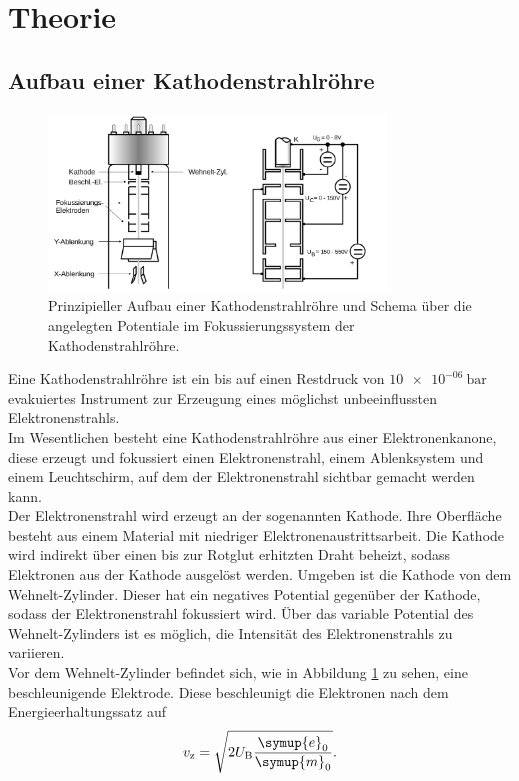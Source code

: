 \section{Theorie}
\label{sec:Theorie}
\subsection{Aufbau einer Kathodenstrahlröhre}
\begin{figure}
  \centering
  \includegraphics[width=0.8\textwidth]{Messdaten/kathode.png}
  \caption{Prinzipieller Aufbau einer Kathodenstrahlröhre und Schema über die angelegten Potentiale im Fokussierungssystem der Kathodenstrahlröhre.}
  \label{fig:kathode}
\end{figure}
Eine Kathodenstrahlröhre ist ein bis auf einen Restdruck von $\SI{10e-06}{\bar}$ evakuiertes Instrument zur Erzeugung eines möglichst unbeeinflussten Elektronenstrahls.\\
Im Wesentlichen besteht eine Kathodenstrahlröhre aus einer Elektronenkanone, diese erzeugt und fokussiert einen Elektronenstrahl, einem Ablenksystem und einem Leuchtschirm, auf dem der Elektronenstrahl sichtbar gemacht werden kann.\\
Der Elektronenstrahl wird erzeugt an der sogenannten Kathode. Ihre Oberfläche besteht aus einem Material mit niedriger Elektronenaustrittsarbeit.
Die Kathode wird indirekt über einen bis zur Rotglut erhitzten Draht beheizt, sodass
Elektronen aus der Kathode ausgelöst werden.
Umgeben ist die Kathode von dem Wehnelt-Zylinder. Dieser hat ein negatives Potential gegenüber der Kathode, sodass der Elektronenstrahl fokussiert wird. Über das variable Potential des Wehnelt-Zylinders ist es möglich, die Intensität des Elektronenstrahls zu variieren.\\
Vor dem Wehnelt-Zylinder befindet sich, wie in Abbildung \ref{fig:kathode} zu sehen, eine beschleunigende Elektrode. Diese beschleunigt die Elektronen nach dem Energieerhaltungssatz auf
\begin{equation}
  \label{eqn:speedy}
  v_\mathrm{z}=\sqrt{2U_\mathrm{B}\frac{\symup{e}_0}{\symup{m}_0}} \text{.}
\end{equation}
